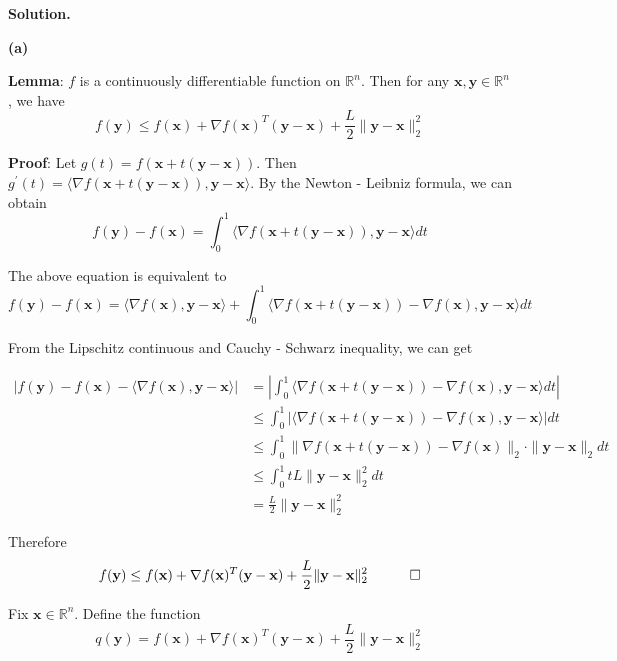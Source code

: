 \documentclass[12pt, a4paper, oneside]{ctexart}
\newenvironment{solution}{\par\noindent\textbf{Solution. }}{\par}
\begin{document}
\begin{solution}
	
\textbf{(a)}

\textbf{Lemma}: $ f $ is a continuously differentiable function on $\mathbb{R}^n $. Then for any $ \mathbf{x}, \mathbf{y} \in \mathbb{R}^n$, we have
$$
f(\mathbf{y}) \leq f(\mathbf{x}) + \nabla f(\mathbf{x})^T (\mathbf{y} - \mathbf{x}) + \frac{L}{2} \|\mathbf{y} - \mathbf{x}\|_2^2
$$

\textbf{Proof}: Let $ g(t) = f(\mathbf{x} + t(\mathbf{y} - \mathbf{x})) $. Then $ g^\prime(t) = \langle \nabla f(\mathbf{x} + t(\mathbf{y} - \mathbf{x})), \mathbf{y} - \mathbf{x} \rangle $. By the Newton - Leibniz formula, we can obtain
$$
f(\mathbf{y}) - f(\mathbf{x}) = \int_0^1 \langle \nabla f(\mathbf{x} + t(\mathbf{y} - \mathbf{x})), \mathbf{y} - \mathbf{x} \rangle dt
$$

The above equation is equivalent to
$$
f(\mathbf{y}) - f(\mathbf{x}) = \langle \nabla f(\mathbf{x}), \mathbf{y} - \mathbf{x} \rangle + \int_0^1 \langle \nabla f(\mathbf{x} + t(\mathbf{y} - \mathbf{x})) - \nabla f(\mathbf{x}), \mathbf{y} - \mathbf{x} \rangle dt
$$

From the Lipschitz continuous and  Cauchy - Schwarz inequality, we can get

\begin{align*}
	|f(\mathbf{y}) - f(\mathbf{x}) - \langle \nabla f(\mathbf{x}), \mathbf{y} - \mathbf{x} \rangle| &= \left| \int_0^1 \langle \nabla f(\mathbf{x} + t(\mathbf{y} - \mathbf{x})) - \nabla f(\mathbf{x}), \mathbf{y} - \mathbf{x} \rangle dt \right| \\
	&\leq \int_0^1 \left| \langle \nabla f(\mathbf{x} + t(\mathbf{y} - \mathbf{x})) - \nabla f(\mathbf{x}), \mathbf{y} - \mathbf{x} \rangle \right| dt \\
	&\leq \int_0^1 \|\nabla f(\mathbf{x} + t(\mathbf{y} - \mathbf{x})) - \nabla f(\mathbf{x})\|_2 \cdot \|\mathbf{y} - \mathbf{x}\|_2 dt \\
	&\leq \int_0^1 tL\|\mathbf{y} - \mathbf{x}\|_2^2 dt \\
	&= \frac{L}{2} \|\mathbf{y} - \mathbf{x}\|_2^2
\end{align*}

Therefore
$$
f(\mathbf{y}) \leq f(\mathbf{x}) + \nabla f(\mathbf{x})^T (\mathbf{y} - \mathbf{x}) + \frac{L}{2} \|\mathbf{y} - \mathbf{x}\|_2^2  \quad \qed
$$

Fix $ \mathbf{x} \in \mathbb{R}^n $. Define the function
$$
q(\mathbf{y})=f(\mathbf{x}) + \nabla f(\mathbf{x})^T(\mathbf{y} - \mathbf{x})+\frac{L}{2}\|\mathbf{y} - \mathbf{x}\|_2^2
$$


\end{solution}
\end{document}
